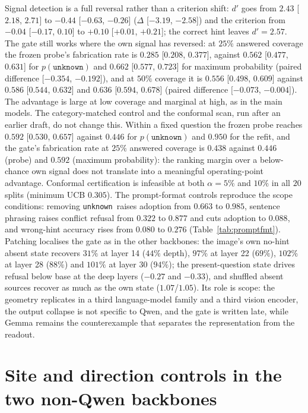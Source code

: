 \documentclass[10pt]{article}
\newcommand{\unknown}{\texttt{unknown}}
\newcommand{\punk}{p(\unknown)}
\begin{document}
Signal detection is a full reversal rather than a criterion shift: $d'$ goes from $2.43$ [$2.18$, $2.71$] to $-0.44$ [$ -0.63$, $-0.26$] ($\Delta$ [$ -3.19$, $-2.58$]) and the criterion from $-0.04$ [$ -0.17$, $0.10$] to $+0.10$ [$+0.01$, $+0.21$]; the correct hint leaves $d'=2.57$. The gate still works where the own signal has reversed: at $25\%$ answered coverage the frozen probe's fabrication rate is $0.285$ [$0.208$, $0.377$], against $0.562$ [$0.477$, $0.631$] for $\punk$ and $0.662$ [$0.577$, $0.723$] for maximum probability (paired difference $[-0.354$, $-0.192]$), and at $50\%$ coverage it is $0.556$ [$0.498$, $0.609$] against $0.586$ [$0.544$, $0.632$] and $0.636$ [$0.594$, $0.678$] (paired difference $[-0.073$, $-0.004]$). The advantage is large at low coverage and marginal at high, as in the main models. The category-matched control and the conformal scan, run after an earlier draft, do not change this. Within a fixed question the frozen probe reaches $0.592$ [$0.530$, $0.657$] against $0.446$ for $\punk$ and $0.950$ for the refit, and the gate's fabrication rate at $25\%$ answered coverage is $0.438$ against $0.446$ (probe) and $0.592$ (maximum probability): the ranking margin over a below-chance own signal does not translate into a meaningful operating-point advantage. Conformal certification is infeasible at both $\alpha=5\%$ and $10\%$ in all $20$ splits (minimum UCB $0.305$). The prompt-format controls reproduce the scope conditions: removing \unknown\ raises adoption from $0.663$ to $0.985$, sentence phrasing raises conflict refusal from $0.322$ to $0.877$ and cuts adoption to $0.088$, and wrong-hint accuracy rises from $0.080$ to $0.276$ (Table~\ref{tab:promptfmt}). Patching localises the gate as in the other backbones: the image's own no-hint absent state recovers $31\%$ at layer 14 ($44\%$ depth), $97\%$ at layer 22 ($69\%$), $102\%$ at layer 28 ($88\%$) and $101\%$ at layer 30 ($94\%$); the present-question state drives refusal below base at the deep layers ($-0.27$ and $-0.33$), and shuffled absent sources recover as much as the own state ($1.07$/$1.05$). Its role is scope: the geometry replicates in a third language-model family and a third vision encoder, the output collapse is not specific to Qwen, and the gate is written late, while Gemma remains the counterexample that separates the representation from the readout.

\section{Site and direction controls in the two non-Qwen backbones}
\label{app:site}
\end{document}
